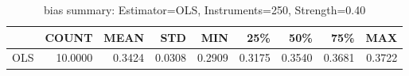 \begin{table}[ht]
\centering
\caption{bias summary: Estimator=OLS, Instruments=250, Strength=0.40}
\begin{tabular}{lrrrrrrrr}
\toprule
 & COUNT & MEAN & STD & MIN & 25\% & 50\% & 75\% & MAX \\
\midrule
OLS & 10.0000 & 0.3424 & 0.0308 & 0.2909 & 0.3175 & 0.3540 & 0.3681 & 0.3722 \\
\bottomrule
\end{tabular}
\end{table}

